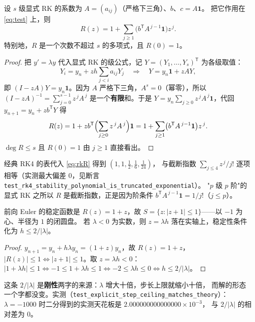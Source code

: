 \begin{theorem}
\label{thm:rk-R}
设 $s$ 级显式 RK 的系数为 $A=(a_{ij})$（严格下三角）、$b$、$c=A\mathbf{1}$。
把它作用在 \eqref{eq:test} 上，则
\begin{equation}
  R(z)=1+\sum_{j\ge1}\bigl(b^{\mathsf T}A^{\,j-1}\mathbf{1}\bigr)z^{\,j}.
  \label{eq:rkR}
\end{equation}
特别地，$R$ 是一个次数不超过 $s$ 的多项式，且 $R(0)=1$。
\end{theorem}

\begin{proof}
把 $y'=\lambda y$ 代入显式 RK 的级公式，记 $Y=(Y_1,\dots,Y_s)^{\mathsf T}$ 为各级取值：
\[
  Y_i=y_n+zh\sum_{j<i}a_{ij}Y_j
  \quad\Longrightarrow\quad
  Y=y_n\mathbf{1}+zAY ,
\]
即 $(I-zA)Y=y_n\mathbf{1}$。因为 $A$ 严格下三角，$A^s=0$（幂零），所以
$(I-zA)^{-1}=\sum_{j=0}^{s-1}z^{\,j}A^{\,j}$ 是一个\textbf{有限}和。于是
$Y=y_n\sum_{j\ge0}z^{\,j}A^{\,j}\mathbf{1}$，代回
$y_{n+1}=y_n+zb^{\mathsf T}Y$ 得
\[
  R(z)=1+zb^{\mathsf T}\Bigl(\sum_{j\ge0}z^{\,j}A^{\,j}\Bigr)\mathbf{1}
      =1+\sum_{j\ge1}\bigl(b^{\mathsf T}A^{\,j-1}\mathbf{1}\bigr)z^{\,j}.
\]
$\deg R\le s$ 且 $R(0)=1$ 由 $j\ge1$ 直接看出。
\end{proof}

\begin{remark}[实测：RK4 的系数就是 $1/j!$]
经典 RK4 的表代入 \eqref{eq:rkR} 得到 $(1,1,\tfrac12,\tfrac16,\tfrac1{24})$，
与截断指数 $\sum_{j\le4}z^{\,j}/j!$ 逐项相等（实测最大偏差 $0$，见断言
\texttt{test\_rk4\_stability\_polynomial\_is\_truncated\_exponential}）。
"$p$ 级 $p$ 阶"的显式 RK 之所以 $R$ 是截断指数，正是因为阶条件
$b^{\mathsf T}A^{\,j-1}\mathbf{1}=1/j!$（$j\le p$）。
\end{remark}

\begin{theorem}
\label{thm:euler-disk}
前向 Euler 的稳定函数是 $R(z)=1+z$，故
$S=\{z:|z+1|\le1\}$——以 $-1$ 为心、半径为 $1$ 的闭圆盘。
若 $\lambda<0$ 为实数，则 $z=\lambda h$ 落在实轴上，稳定性条件化为
$h\le2/|\lambda|$。
\end{theorem}

\begin{proof}
$y_{n+1}=y_n+h\lambda y_n=(1+z)y_n$，故 $R(z)=1+z$，
$|R(z)|\le1\iff|z+1|\le1$。取 $z=\lambda h<0$：$|1+\lambda h|\le1\iff-1\le1+\lambda h\le1
\iff-2\le\lambda h\le0\iff h\le2/|\lambda|$。
\end{proof}

\begin{remark}
这条 $2/|\lambda|$ 是\textbf{刚性}两字的来源：$\lambda$ 增大十倍，步长上限就缩小十倍，
而解的形态一个字都没变。实测（\texttt{test\_explicit\_step\_ceiling\_matches\_theory}）：
$\lambda=-1000$ 时二分得到的实测天花板是 $2.000000000000000\times10^{-3}$，
与 $2/|\lambda|$ 的相对差为 $0$。
\end{remark}

